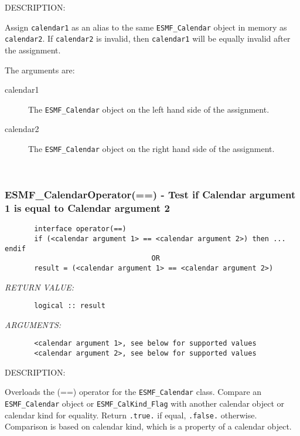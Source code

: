 {\sf DESCRIPTION:\\ }


       Assign {\tt calendar1} as an alias to the same {\tt ESMF\_Calendar} 
       object in memory as {\tt calendar2}. If {\tt calendar2} is invalid, then 
       {\tt calendar1} will be equally invalid after the assignment.
  
       The arguments are:
       \begin{description} 
       \item[calendar1] 
            The {\tt ESMF\_Calendar} object on the left hand side of the 
            assignment.
       \item[calendar2] 
            The {\tt ESMF\_Calendar} object on the right hand side of the 
            assignment.
       \end{description}
   
 
\mbox{}\hrulefill\ 
 
\subsubsection [ESMF\_CalendarOperator(==)] {ESMF\_CalendarOperator(==) - Test if Calendar argument 1 is equal to Calendar argument 2}


  
\begin{verbatim}       interface operator(==)
       if (<calendar argument 1> == <calendar argument 2>) then ... endif
                                   OR
       result = (<calendar argument 1> == <calendar argument 2>)\end{verbatim}{\em RETURN VALUE:}
\begin{verbatim}       logical :: result\end{verbatim}{\em ARGUMENTS:}
\begin{verbatim}       <calendar argument 1>, see below for supported values
       <calendar argument 2>, see below for supported values\end{verbatim}
{\sf DESCRIPTION:\\ }


       \begin{sloppypar}
       Overloads the (==) operator for the {\tt ESMF\_Calendar} class.
       Compare an {\tt ESMF\_Calendar} object or {\tt ESMF\_CalKind\_Flag} with
       another calendar object or calendar kind for equality.  Return
       {\tt .true.} if equal, {\tt .false.} otherwise.  Comparison is based on
       calendar kind, which is a property of a calendar object.
       \end{sloppypar}
  
